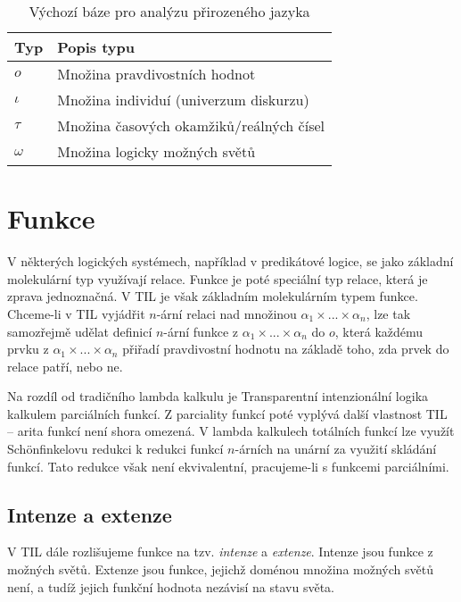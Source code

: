 \begin{table}
    \caption{Výchozí báze pro analýzu přirozeného jazyka}\label{tab:default-base}
    \centering

    \begin{tabular} { | l l | }
        \hline
        Typ      & Popis typu \\
        \hline
        $o$      & Množina pravdivostních hodnot \\
        $\iota$  & Množina individuí (univerzum diskurzu) \\
        $\tau$   & Množina časových okamžiků/reálných čísel \\
        $\omega$ & Množina logicky možných světů \\
        \hline
    \end{tabular}
\end{table}

\section{Funkce}\label{fn-arity}

V některých logických systémech, například v predikátové logice, se jako základní molekulární typ
využívají relace\cite{logika-duzi}. Funkce je poté speciální typ relace, která je zprava
jednoznačná. V TIL je však základním molekulárním typem funkce. Chceme-li v TIL vyjádřit $n$-ární
relaci nad množinou $\alpha_1 \times ... \times \alpha_n$, lze tak samozřejmě udělat
definicí $n$-ární funkce
z $\alpha_1 \times ... \times \alpha_n$ do $o$, která každému prvku
z $\alpha_1 \times ... \times \alpha_n$ přiřadí pravdivostní hodnotu na základě toho, zda prvek
do relace patří, nebo ne\cite{til-duzi}.

Na rozdíl od tradičního lambda kalkulu je Transparentní intenzionální logika kalkulem parciálních
funkcí. Z parciality funkcí poté vyplývá další vlastnost TIL -- arita funkcí není shora omezená.
V lambda kalkulech totálních funkcí lze využít Sch{\"o}nfinkelovu redukci k redukci funkcí
$n$-árních na unární za využití skládání funkcí. Tato redukce však není ekvivalentní, pracujeme-li
s funkcemi parciálními\cite{partiality}.

\subsection{Intenze a extenze}

V TIL dále rozlišujeme funkce na tzv. \textit{intenze} a \textit{extenze}. Intenze jsou funkce
z možných světů. Extenze jsou funkce, jejichž doménou množina možných světů není, a tudíž jejich
funkční hodnota nezávisí na stavu světa\cite{til-duzi}.

